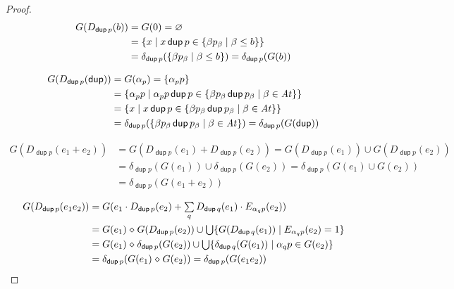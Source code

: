 \documentclass{article}
\newcommand\cset[1]{\{#1\}}
\newcommand\At{\ensuremath{\mathit{At}}}
\renewcommand\smash{\mathrel{\diamond}}
\newcommand\ssum{\mathop{\textstyle\sum}}
\newcommand\sbigcup{\mathop{\textstyle\bigcup}}
\newcommand\pdup{\mathop{\mathsf{dup}}}
\begin{document}
\begin{proof}
\begin{align*}
G(D_{\pdup p}(b))
&= G(0)
= \emptyset\\
&= \set{x}{x\pdup p\in\set{\beta p_\beta}{\beta\leq b}}\\
&= \delta_{\pdup p}(\set{\beta p_\beta}{\beta\leq b})
= \delta_{\pdup p}(G(b))
\end{align*}

\begin{align*}
G(D_{\pdup p}(\pdup))
&= G(\alpha_p)
= \cset{\alpha_pp}\\
&= \set{\alpha_pp}{\alpha_pp\pdup p\in\set{\beta p_\beta\pdup p_\beta}{\beta\in\At}}\\
&= \set{x}{x\pdup p\in\set{\beta p_\beta\pdup p_\beta}{\beta\in\At}}\\
&= \delta_{\pdup p}(\set{\beta p_\beta\pdup p_\beta}{\beta\in\At})
= \delta_{\pdup p}(G(\pdup))
\end{align*}

\begin{align*}
G(D_{\pdup p}(e_1+e_2))
&= G(D_{\pdup p}(e_1)+D_{\pdup p}(e_2))
= G(D_{\pdup p}(e_1))\cup G(D_{\pdup p}(e_2))\\
&= \delta_{\pdup p}(G(e_1))\cup\delta_{\pdup p}(G(e_2))
= \delta_{\pdup p}(G(e_1)\cup G(e_2))\\
&= \delta_{\pdup p}(G(e_1+e_2))
\end{align*}

\begin{align*}
G(D_{\pdup p}(e_1e_2))
&= G(e_1\cdot D_{\pdup p}(e_2) + \ssum_{q} D_{\pdup q}(e_1)\cdot E_{\alpha_qp}(e_2))\\
&= G(e_1)\smash G(D_{\pdup p}(e_2)) \cup \sbigcup\set{G(D_{\pdup q}(e_1))}{E_{\alpha_qp}(e_2)=1}\\
&= G(e_1)\smash \delta_{\pdup p}(G(e_2)) \cup \sbigcup\set{\delta_{\pdup q}(G(e_1))}{\alpha_qp\in G(e_2)}\\
&= \delta_{\pdup p}(G(e_1)\smash G(e_2))
= \delta_{\pdup p}(G(e_1e_2))
\end{align*}


\end{proof}
\end{document}
